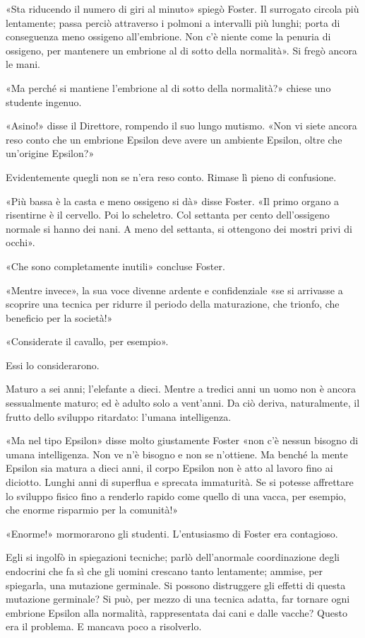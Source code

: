 \documentclass[
a5paper, %
10pt, %
twoside, 
onecolumn, %
openany, %
]{memoir}
\begin{document}
«Sta riducendo il numero di giri al minuto» spiegò Foster. Il surrogato circola più lentamente; passa perciò attraverso i polmoni a intervalli più lunghi; porta di conseguenza meno ossigeno all’embrione. Non c’è niente come la penuria di ossigeno, per mantenere un embrione al di sotto della normalità». Si fregò ancora le mani.

«Ma perché si mantiene l’embrione al di sotto della normalità?» chiese uno studente ingenuo.

«Asino!» disse il Direttore, rompendo il suo lungo mutismo. «Non vi siete ancora reso conto che un embrione Epsilon deve avere un ambiente Epsilon, oltre che un’origine Epsilon?»

Evidentemente quegli non se n’era reso conto. Rimase lì pieno di confusione.

«Più bassa è la casta e meno ossigeno si dà» disse Foster. «Il primo organo a risentirne è il cervello. Poi lo scheletro. Col settanta per cento dell’ossigeno normale si hanno dei nani. A meno del settanta, si ottengono dei mostri privi di occhi».

«Che sono completamente inutili» concluse Foster.

«Mentre invece», la sua voce divenne ardente e confidenziale «se si arrivasse a scoprire una tecnica per ridurre il periodo della maturazione, che trionfo, che beneficio per la società!»

«Considerate il cavallo, per esempio».

Essi lo considerarono.

Maturo a sei anni; l’elefante a dieci. Mentre a tredici anni un uomo non è ancora sessualmente maturo; ed è adulto solo a vent’anni. Da ciò deriva, naturalmente, il frutto dello sviluppo ritardato: l’umana intelligenza.

«Ma nel tipo Epsilon» disse molto giustamente Foster «non c’è nessun bisogno di umana intelligenza. Non ve n’è bisogno e non se n’ottiene. Ma benché la mente Epsilon sia matura a dieci anni, il corpo Epsilon non è atto al lavoro fino ai diciotto. Lunghi anni di superflua e sprecata immaturità. Se si potesse affrettare lo sviluppo fisico fino a renderlo rapido come quello di una vacca, per esempio, che enorme risparmio per la comunità!»

«Enorme!» mormorarono gli studenti. L’entusiasmo di Foster era contagioso.

Egli si ingolfò in spiegazioni tecniche; parlò dell’anormale coordinazione degli endocrini che fa sì che gli uomini crescano tanto lentamente; ammise, per spiegarla, una mutazione germinale. Si possono distruggere gli effetti di questa mutazione germinale? Si può, per mezzo di una tecnica adatta, far tornare ogni embrione Epsilon alla normalità, rappresentata dai cani e dalle vacche? Questo era il problema. E mancava poco a risolverlo.
\end{document}
